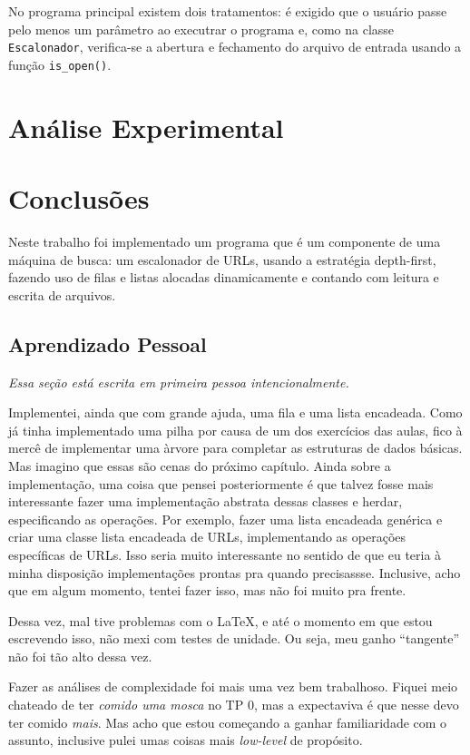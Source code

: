 \documentclass{article}
\def\code#1{\texttt{#1}}
\begin{document}
No programa principal existem dois tratamentos: é exigido que o usuário passe pelo menos um parâmetro ao executrar o programa e, como na classe \code{Escalonador}, verifica-se a abertura e fechamento do arquivo de entrada usando a função \code{is\_open()}. 

\section{Análise Experimental}

\section{Conclusões}

Neste trabalho foi implementado um programa que é um componente de uma máquina de busca: um escalonador de URLs, usando a estratégia depth-first, fazendo uso de filas e listas alocadas dinamicamente e contando com leitura e escrita de arquivos.

\subsection{Aprendizado Pessoal}

\textit{Essa seção está escrita em primeira pessoa intencionalmente.}

Implementei, ainda que com grande ajuda, uma fila e uma lista encadeada. Como já tinha implementado uma pilha por causa de um dos exercícios das aulas, fico à mercê de implementar uma àrvore para completar as estruturas de dados básicas. Mas imagino que essas são cenas do próximo capítulo. Ainda sobre a implementação, uma coisa que pensei posteriormente é que talvez fosse mais interessante fazer uma implementação abstrata dessas classes e herdar, especificando as operações. Por exemplo, fazer uma lista encadeada genérica e criar uma classe lista encadeada de URLs, implementando as operações específicas de URLs. Isso seria muito interessante no sentido de que eu teria à minha disposição implementações prontas pra quando precisassse. Inclusive, acho que em algum momento, tentei fazer isso, mas não foi muito pra frente.

Dessa vez, mal tive problemas com o \LaTeX, e até o momento em que estou escrevendo isso, não mexi com testes de unidade. Ou seja, meu ganho ``tangente'' não foi tão alto dessa vez.

Fazer as análises de complexidade foi mais uma vez bem trabalhoso. Fiquei meio chateado de ter \textit{comido uma mosca} no TP 0, mas a expectaviva é que nesse devo ter comido \textit{mais}. Mas acho que estou começando a ganhar familiaridade com o assunto, inclusive pulei umas coisas mais \textit{low-level} de propósito.
\end{document}

